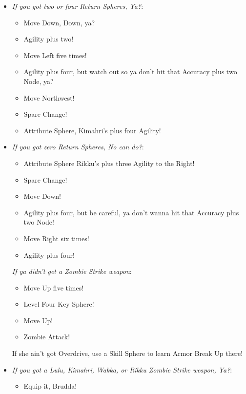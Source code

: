 \begin{spheregrid}
\begin{itemize}
\item \textit{If you got two or four Return Spheres, Ya?}:
\begin{itemize}
\item Move Down, Down, ya?
\item Agility plus two!
\item Move Left five times!
\item Agility plus four, but watch out so ya don't hit that Accuracy plus two Node, ya?
\item Move Northwest!
\item Spare Change!
\item Attribute Sphere, Kimahri's plus four Agility!
\end{itemize}
\item \textit{If you got zero Return Spheres, No can do?}:
\begin{itemize}
\item Attribute Sphere Rikku's plus three Agility to the Right!
\item Spare Change!
\item Move Down!
\item Agility plus four, but be careful, ya don't wanna hit that Accuracy plus two Node!
\item Move Right six times!
\item Agility plus four!
\end{itemize}
\tidusf \textit{If ya didn't get a Zombie Strike weapon}:
\begin{itemize}
\item Move Up five times!
\item Level Four Key Sphere!
\item Move Up!
\item Zombie Attack!
\end{itemize}
\rikkuf If she ain't got Overdrive, use a Skill Sphere to learn Armor Break Up there!
\end{itemize}
\end{spheregrid}
\begin{equip}
\begin{itemize}
\item \textit{If you got a Lulu, Kimahri, Wakka, or Rikku Zombie Strike weapon, Ya?}:
\begin{itemize}
\item Equip it, Brudda!
\end{itemize}
\end{itemize}
\end{equip}
